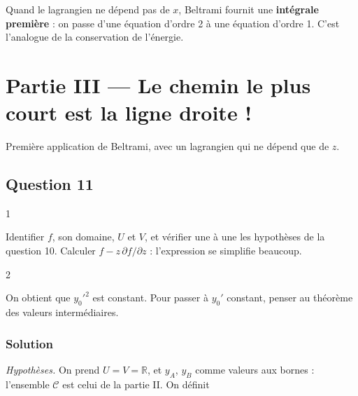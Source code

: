 \documentclass[11pt,a4paper]{article}
\newcommand{\equationajustee}[1]{%
  \sbox{\boiteequation}{$\displaystyle #1$}%
  \ifdim\wd\boiteequation>\linewidth
    \[\resizebox{\linewidth}{!}{\usebox{\boiteequation}}\]%
  \else
    \[#1\]%
  \fi}
\begin{document}
\begin{methode}

Quand le lagrangien ne dépend pas de \(x\), Beltrami fournit une \textbf{intégrale première} : on passe d'une équation d'ordre 2 à une équation d'ordre 1. C'est l'analogue de la conservation de l'énergie.

\end{methode}

\hypertarget{partie-iii-le-chemin-le-plus-court-est-la-ligne-droite}{%
\section{Partie III --- Le chemin le plus court est la ligne droite !}\label{partie-iii-le-chemin-le-plus-court-est-la-ligne-droite}}

Première application de Beltrami, avec un lagrangien qui ne dépend que de \(z\).

\hypertarget{question-11}{%
\subsection{Question 11}\label{question-11}}

\begin{indication}{1}

Identifier \(f\), son domaine, \(U\) et \(V\), et vérifier une à une les hypothèses de la question 10. Calculer \(f-z\,\partial f/\partial z\) : l'expression se simplifie beaucoup.

\end{indication}

\begin{indication}{2}

On obtient que \(y_0'^2\) est constant. Pour passer à \(y_0'\) constant, penser au théorème des valeurs intermédiaires.

\end{indication}

\hypertarget{solution-10}{%
\subsubsection{Solution}\label{solution-10}}

\emph{Hypothèses.} On prend \(U=V=\mathbb R\), et \(y_A\), \(y_B\) comme valeurs aux bornes : l'ensemble \(\mathcal C\) est celui de la partie II. On définit

\equationajustee{f:[x_A,x_B]\times\mathbb R\times\mathbb R\to\mathbb R,\qquad f(x,y,z)=\sqrt{1+z^2}.}
\end{document}
